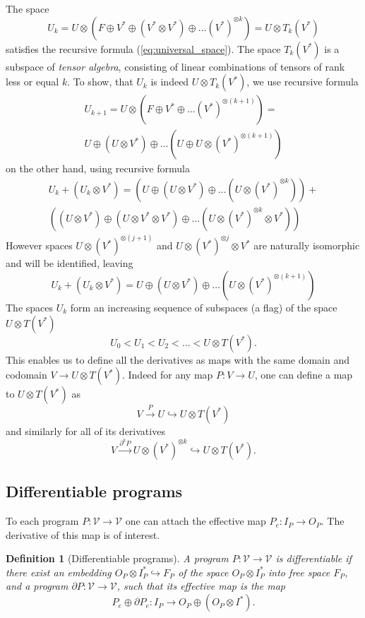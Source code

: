 \documentclass{article}
\newcommand{\VV}{\mathcal{V}}
\newcommand{\D}{\partial}
\newtheorem{definicija}{Definition}[section]
\begin{document}
The space 
\begin{equation}
\label{eq:k-th-virtual-space}
U_k = U\otimes \left(F\oplus V^* \oplus (V^*\otimes V^*)\oplus\ldots
(V^*)^{\otimes k}\right) = U\otimes T_k(V^*)
\end{equation}
satisfies the recursive formula (\ref{eq:universal_space}). The space $T_k(V^*)$
is a subspace of \emph{tensor algebra}, consisting of linear combinations of tensors of rank less
or equal $k$. To show, that $U_k$ is indeed $U\otimes T_k(V^*)$, we use
recursive formula
\begin{multline*}
  U_{k+1}=U\otimes(F\oplus V^*\oplus\ldots (V^*)^{\otimes (k+1)})=\\
 U\oplus (U\otimes V^*)\oplus\ldots (U\oplus U\otimes(V^*)^{\otimes (k+1)})
\end{multline*}
on the other hand, using recursive formula
\begin{multline}
  U_k+(U_k\otimes V^*) = \left( U\oplus (U\otimes V^*)\oplus\ldots (U\otimes(V^*)^{\otimes k})\right) + \\
  \left((U\otimes V^*) \oplus (U\otimes V^*\otimes V^*) \oplus\ldots (U\otimes(V^*)^{\otimes k}\otimes V^*)\right)
\end{multline}
However spaces $U\otimes(V^*)^{\otimes (j+1)}$ and $U\otimes (V^*)^{\otimes
  j}\otimes V^*$ are naturally isomorphic and will be identified, leaving 
\begin{equation}
  U_k+(U_k\otimes V^*) = U\oplus (U\otimes V^*)\oplus\ldots (U\otimes(V^*)^{\otimes (k+1)})
\end{equation}
The spaces $U_k$ form an increasing sequence of subspaces (a flag) of the space $U\otimes
T(V^*)$
\begin{equation}
  \label{eq:flag}
  U_0<U_1<U_2<\ldots < U\otimes T(V^*).
\end{equation}
This enables us to define all the derivatives as maps with
the same domain and codomain $V\to U\otimes T(V^*)$. Indeed for any map $P:V\to
U$, one can define a map to $U\otimes T(V^*)$ as
$$V\xrightarrow{P}U\hookrightarrow U\otimes T(V^*)$$ and similarly  for all of its
derivatives
$$V\xrightarrow{\D^k P} U\otimes (V^*)^{\otimes k}\hookrightarrow U\otimes
T(V^*).$$
\subsection{Differentiable programs}
To each program $P:\VV\to \VV$ one can attach the effective map $P_e:I_P\to
O_P$. The derivative of this map is of interest. 
\begin{definicija}[Differentiable programs]
  A program $P:\VV\to \VV$ is differentiable if there exist an embedding
  $O_P\otimes I_P^*\hookrightarrow F_P$ of the space $O_P\otimes I_P^*$ into
  free space $F_P$, and a program $\D P:\VV\to \VV$, such that its effective
  map is the map
  \begin{equation}
    \label{eq:program_derivative}
    P_e\oplus \D P_e:I_P\rightarrow O_P\oplus (O_P\otimes I^*).
  \end{equation}
\end{definicija}
\end{document}
